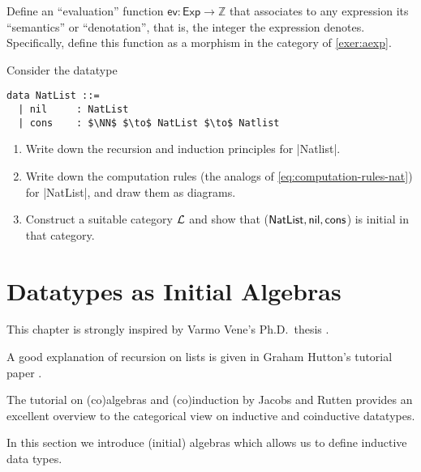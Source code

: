 \begin{exer}
  Define an ``evaluation'' function $\mathsf{ev} : \mathsf{Exp} \to \mathbb{Z}$ that associates to any expression its ``semantics'' or ``denotation'', that is, the integer the expression denotes.
  Specifically, define this function as a morphism in the category of \cref{exer:aexp}.
\end{exer}

\begin{exer}\label{exer:natlist_is_initial}
  Consider the datatype
\begin{lstlisting}[mathescape=true]
  data NatList ::=
  | nil     : NatList
  | cons    : $\NN$ $\to$ NatList $\to$ Natlist
\end{lstlisting}

  \begin{enumerate}
  \item Write down the recursion and induction principles for |Natlist|.
  \item  Write down the computation rules (the analogs of \cref{eq:computation-rules-nat}) for |NatList|, and draw them as diagrams.
  \item Construct a suitable category $\mathcal{L}$ and show that ($\mathsf{NatList}, \mathsf{nil}, \mathsf{cons}$) is initial in that category.
  \end{enumerate}
  
\end{exer}

\section{Datatypes as Initial Algebras}
\label{sec:datatypes-as-initial}



\begin{reading*}
  This chapter is strongly inspired by Varmo Vene's Ph.D.\ thesis \cite[Chapter 2]{vene_phd}.

  A good explanation of recursion on lists is given in Graham Hutton's tutorial paper \cite{DBLP:journals/jfp/Hutton99}.

  The tutorial on (co)algebras and (co)induction by Jacobs and Rutten \cite{jacobs-rutten-tutorial} provides an excellent overview to the categorical view on inductive and coinductive datatypes.
\end{reading*}

In this section we introduce (initial) algebras which allows us to define inductive data types.

